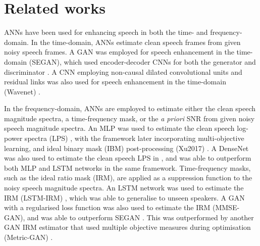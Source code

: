 \documentclass[letterpaper]{article} \usepackage{aaai20}  \usepackage{times}  \usepackage{helvet} \usepackage{courier}  \usepackage[hyphens]{url}  \usepackage{graphicx} \urlstyle{rm} \def\UrlFont{\rm}  \usepackage{graphicx}  \frenchspacing  \setlength{\pdfpagewidth}{8.5in}  \setlength{\pdfpageheight}{11in}
\begin{document}
\section{Related works}\label{sec_rlw}
ANNs have been used for enhancing speech in both the time- and frequency-domain. In the time-domain, ANNs estimate clean speech frames from given noisy speech frames. A GAN was employed for speech enhancement in the time-domain (SEGAN), which used encoder-decoder CNNs for both the generator and discriminator \cite{segan}. A CNN employing non-causal dilated convolutional units and residual links was also used for speech enhancement in the time-domain (Wavenet) \cite{wavenet}.

In the frequency-domain, ANNs are employed to estimate either the clean speech magnitude spectra, a time-frequency mask, or the \textit{a priori} SNR from given noisy speech magnitude spectra. An MLP was used to estimate the clean speech log-power spectra (LPS) \cite{6932438}, with the framework later incorporating multi-objective learning, and ideal binary mask (IBM) post-processing (Xu2017) \cite{xu2017multi}. A DenseNet was also used to estimate the clean speech LPS in \cite{dense_SE}, and was able to outperform both MLP and LSTM networks in the same framework. Time-frequency masks, such as the ideal ratio mask (IRM), are applied as a suppression function to the noisy speech magnitude spectra. An LSTM network was used to estimate the IRM (LSTM-IRM) \cite{chen2017long}, which was able to generalise to unseen speakers. A GAN with a regularised loss function was also used to estimate the IRM (MMSE-GAN), and was able to outperform SEGAN \cite{MMSE-GAN}. This was outperformed by another GAN IRM estimator that used multiple objective measures during optimisation (Metric-GAN) \cite{metric-GAN}.
\end{document}
